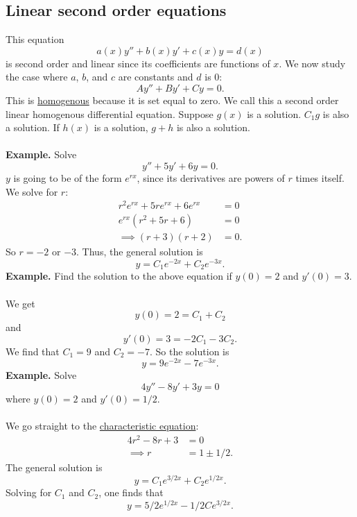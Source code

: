 \documentclass[11pt, oneside]{article}   	%
\begin{document}
\subsection{Linear second order equations}
This equation
$$
a(x)y'' +b(x)y' +c(x)y = d(x)
$$
is second order and linear since its coefficients are functions of $x$. We now study the case where $a$, $b$, and $c$ are constants and $d$ is $0$:
$$
Ay'' + By' + Cy = 0.
$$
This is \underline{homogenous} because it is set equal to zero. We call this a second order linear homogenous differential equation. Suppose $g(x)$ is a solution. $C_1g$ is also a solution. If $h(x)$ is a solution, $g + h$ is also a solution.\\\\
\textbf{Example.} Solve
$$
y'' + 5y' + 6y =0.
$$
$y$ is going to be of the form $e^{rx}$, since its derivatives are powers of $r$ times itself. We solve for $r$:
\begin{align*}
r^2e^{rx} + 5 re^{rx} + 6e^{rx} 	&= 0 \\
e^{rx} (r^2 + 5r + 6) 			&= 0 \\
\implies (r+3)(r+2)			&= 0.
\end{align*}
So $r=-2$ or $-3$. Thus, the general solution is 
$$
\boxed{y = C_1e^{-2x} + C_2e^{-3x}.}
$$
\textbf{Example.} Find the solution to the above equation if $y(0) = 2$ and $y'(0)=3$. \\\\
We get 
$$
y(0) = 2 = C_1 + C_2
$$
and
$$
y'(0) = 3 = -2C_1 - 3C_2.
$$
We find that $C_1 =9 $ and $C_2 = -7$. So the solution is
$$
\boxed{y = 9e^{-2x} - 7e^{-3x}.}
$$
\textbf{Example.} Solve
$$
4y'' - 8y' + 3y = 0
$$
where $y(0)=2$ and $y'(0) = 1/2$.\\\\
We go straight to the \underline{characteristic equation}:
\begin{align*}
4r^2 - 8r + 3 	&= 0\\
\implies r		&= 1 \pm 1/2.
\end{align*}
The general solution is 
$$
y= C_1e^{3/2x} + C_2 e^{1/2x}.
$$
Solving for $C_1$ and $C_2$, one finds that
$$
\boxed{y=  5/2 e^{1/2x} - 1/2Ce^{3/2x}.}
$$
\end{document}
